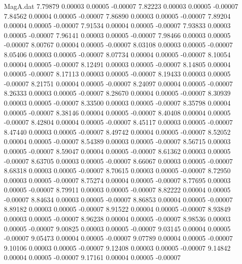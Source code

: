 \begin{filecontents}{MagA.dat}
   7.79879    0.00003    0.00005   -0.00007
   7.82223    0.00003    0.00005   -0.00007
   7.84562    0.00004    0.00005   -0.00007
   7.86890    0.00003    0.00005   -0.00007
   7.89204    0.00004    0.00005   -0.00007
   7.91534    0.00004    0.00005   -0.00007
   7.93833    0.00003    0.00005   -0.00007
   7.96141    0.00003    0.00005   -0.00007
   7.98466    0.00003    0.00005   -0.00007
   8.00767    0.00004    0.00005   -0.00007
   8.03108    0.00003    0.00005   -0.00007
   8.05406    0.00003    0.00005   -0.00007
   8.07734    0.00004    0.00005   -0.00007
   8.10054    0.00004    0.00005   -0.00007
   8.12491    0.00003    0.00005   -0.00007
   8.14805    0.00004    0.00005   -0.00007
   8.17113    0.00003    0.00005   -0.00007
   8.19433    0.00003    0.00005   -0.00007
   8.21751    0.00004    0.00005   -0.00007
   8.24097    0.00004    0.00005   -0.00007
   8.26333    0.00003    0.00005   -0.00007
   8.28670    0.00004    0.00005   -0.00007
   8.30939    0.00003    0.00005   -0.00007
   8.33500    0.00003    0.00005   -0.00007
   8.35798    0.00004    0.00005   -0.00007
   8.38146    0.00004    0.00005   -0.00007
   8.40408    0.00004    0.00005   -0.00007
   8.42804    0.00004    0.00005   -0.00007
   8.45117    0.00003    0.00005   -0.00007
   8.47440    0.00003    0.00005   -0.00007
   8.49742    0.00004    0.00005   -0.00007
   8.52052    0.00004    0.00005   -0.00007
   8.54389    0.00003    0.00005   -0.00007
   8.56715    0.00003    0.00005   -0.00007
   8.59047    0.00004    0.00005   -0.00007
   8.61362    0.00003    0.00005   -0.00007
   8.63705    0.00003    0.00005   -0.00007
   8.66067    0.00003    0.00005   -0.00007
   8.68318    0.00003    0.00005   -0.00007
   8.70615    0.00003    0.00005   -0.00007
   8.72950    0.00003    0.00005   -0.00007
   8.75274    0.00004    0.00005   -0.00007
   8.77695    0.00003    0.00005   -0.00007
   8.79911    0.00003    0.00005   -0.00007
   8.82222    0.00004    0.00005   -0.00007
   8.84634    0.00003    0.00005   -0.00007
   8.86853    0.00004    0.00005   -0.00007
   8.89182    0.00003    0.00005   -0.00007
   8.91522    0.00004    0.00005   -0.00007
   8.93849    0.00003    0.00005   -0.00007
   8.96238    0.00004    0.00005   -0.00007
   8.98536    0.00003    0.00005   -0.00007
   9.00825    0.00003    0.00005   -0.00007
   9.03145    0.00004    0.00005   -0.00007
   9.05473    0.00004    0.00005   -0.00007
   9.07789    0.00004    0.00005   -0.00007
   9.10106    0.00003    0.00005   -0.00007
   9.12408    0.00003    0.00005   -0.00007
   9.14842    0.00004    0.00005   -0.00007
   9.17161    0.00004    0.00005   -0.00007

\end{filecontents}

